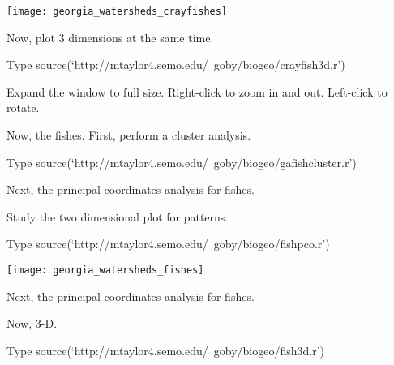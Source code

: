\documentclass[xcolor=svgnames]{beamer}
\begin{document}
\begin{frame}[plain]
	\centering
	\texttt{[image: georgia\_watersheds\_crayfishes]}
\end{frame}


\begin{frame}[plain]{Now, plot 3 dimensions at the same time.}

\begin{block}{Type}
	source(`http://mtaylor4.semo.edu/~goby/biogeo/crayfish3d.r')
\end{block}

Expand the window to full size. Right-click to zoom in and out. Left-click to rotate.

\end{frame}

\begin{frame}[plain]{Now, the fishes. First, perform a cluster analysis.}

\begin{block}{Type}
	source(`http://mtaylor4.semo.edu/~goby/biogeo/gafishcluster.r')
\end{block}
\end{frame}

{
\begin{frame}[plain]
\end{frame}
}


\begin{frame}[plain]{Next, the principal coordinates analysis for fishes.}

Study the two dimensional plot for patterns.
\begin{block}{Type}
	source(`http://mtaylor4.semo.edu/~goby/biogeo/fishpco.r')
\end{block}
\end{frame}


{
\begin{frame}[plain]
\end{frame}
}

\begin{frame}[plain]
	\centering
	\texttt{[image: georgia\_watersheds\_fishes]}
\end{frame}


\begin{frame}[plain]{Next, the principal coordinates analysis for fishes.}

Now, 3-D.

\begin{block}{Type}
	source(`http://mtaylor4.semo.edu/~goby/biogeo/fish3d.r')
\end{block}
\end{frame}
\end{document}

